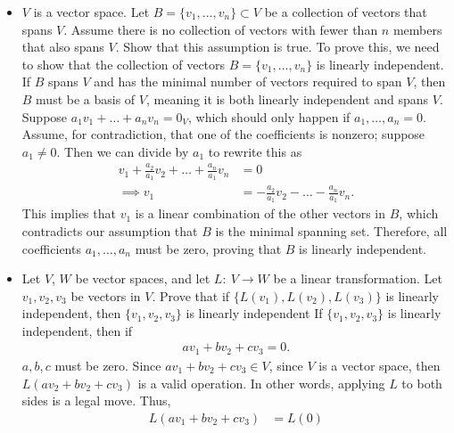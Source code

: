 \documentclass{report}
\begin{document}
\begin{itemize}
        \item $V$ is a vector space. Let $B = \{v_{1}, ..., v_{n}\} \subset V$ be a collection of vectors that spans $V$. Assume there is no collection of vectors with fewer than $n$ members that also spans $V$. Show that this assumption is true.
            \bigbreak \noindent 
            To prove this, we need to show that the collection of vectors \( B = \{v_1, \dots, v_n\} \) is linearly independent. If \( B \) spans \( V \) and has the minimal number of vectors required to span \( V \), then \( B \) must be a basis of \( V \), meaning it is both linearly independent and spans \( V \).
            \bigbreak \noindent 
            \bigbreak \noindent 
            Suppose \( a_{1}v_{1} + \dots + a_{n}v_{n} = 0_{V} \), which should only happen if \( a_{1}, \dots, a_{n} = 0 \). Assume, for contradiction, that one of the coefficients is nonzero; suppose \( a_{1} \neq 0 \). Then we can divide by \( a_{1} \) to rewrite this as
            \begin{align*}
                v_{1} + \frac{a_{2}}{a_{1}}v_{2} + \dots + \frac{a_{n}}{a_{1}}v_{n} &= 0 \\
                \implies v_{1} &= -\frac{a_{2}}{a_{1}}v_{2} - \dots - \frac{a_{n}}{a_{1}}v_{n}.
            \end{align*}
            \bigbreak \noindent 
            This implies that \( v_{1} \) is a linear combination of the other vectors in \( B \), which contradicts our assumption that \( B \) is the minimal spanning set. Therefore, all coefficients \( a_1, \dots, a_n \) must be zero, proving that \( B \) is linearly independent.
        \item Let $V$, $W$ be vector spaces, and let $L:\ V \to W$ be  a linear transformation. Let $v_{1}, v_{2}, v_{3} $ be vectors in $V$. Prove that if $\{ L(v_{1}), L(v_{2}), L(v_{3}) \}$ is linearly independent, then $\{v_{1}, v_{2}, v_{3}\}$ is linearly independent
            \bigbreak \noindent 
            If $\{v_{1}, v_{2}, v_{3}\}$ is linearly independent, then if
            \begin{align*}
                av_{1} + bv_{2}  + cv_{3} = 0
            .\end{align*}
            $a,b,c$ must be zero. Since $av_{1} + bv_{2} + cv_{3} \in V$, since $V$ is a vector space, then $L(av_{2} + bv_{2} + cv_{3})$ is a valid operation. In other words, applying $L$ to both sides is a legal move. Thus,
            \begin{align*}
                L(av_{1} + bv_{2} + cv_{3}) &= L(0) \\

\end{align*}
\end{itemize}
\end{document}
